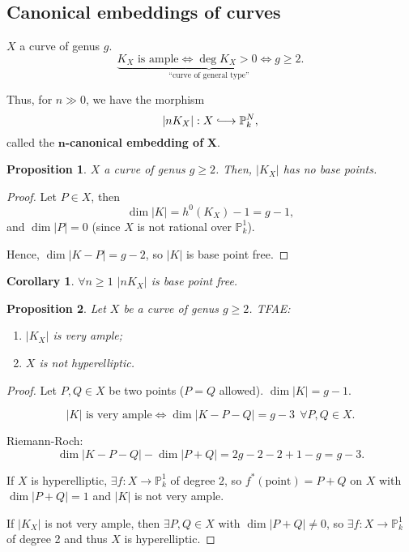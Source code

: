 \documentclass[12pt]{article}
\newtheorem*{proposition}{Proposition}
\newtheorem*{corollary}{Corollary}
\theoremstyle{definition}
\theoremstyle{remark}
\begin{document}
\subsection*{Canonical embeddings of curves}
$X$ a curve of genus $g$.
\[\underbrace{K_X\text{ is ample}\Longleftrightarrow\deg K_X>0\Longleftrightarrow g\geq2}_{\text{``curve of general type''}}.\]

Thus, for $n\gg0$, we have the morphism
\[|nK_X|:X\lhook\joinrel\longrightarrow\mathbb{P}_k^N,\]
called the $\boldsymbol{n}$\textbf{-canonical embedding of }$\boldsymbol{X}$.

\begin{proposition}
$X$ a curve of genus $g\geq2$. Then, $|K_X|$ has no base points.
\end{proposition}

\begin{proof}
Let $P\in X$, then
\[\dim|K|=h^0(K_X)-1=g-1,\]
and $\dim|P|=0$ (since $X$ is not rational over $\mathbb{P}_k^1$).

Hence, $\dim|K-P|=g-2$, so $|K|$ is base point free.
\end{proof}

\begin{corollary}
$\forall n\geq1$ $|nK_X|$ is base point free.
\end{corollary}

\begin{proposition}
Let $X$ be a curve of genus $g\geq2$. TFAE:
\begin{enumerate}[label=\arabic*)]
\item $|K_X|$ is very ample;
\item $X$ is not hyperelliptic.
\end{enumerate}
\end{proposition}

\begin{proof}
Let $P,Q\in X$ be two points ($P=Q$ allowed). $\dim|K|=g-1$.

\[|K|\text{ is very ample}\Longleftrightarrow\dim|K-P-Q|=g-3\ \ \forall P,Q\in X.\]

Riemann-Roch:
\[\dim|K-P-Q|-\dim|P+Q|=2g-2-2+1-g=g-3.\]

If $X$ is hyperelliptic, $\exists f:X\rightarrow\mathbb{P}_k^1$ of degree $2$, so $f^*(\text{point})=P+Q$ on $X$ with $\dim|P+Q|=1$ and $|K|$ is not very ample.

If $|K_X|$ is not very ample, then $\exists P,Q\in X$ with $\dim|P+Q|\neq0$, so $\exists f:X\rightarrow\mathbb{P}_k^1$ of degree 2 and thus $X$ is hyperelliptic.
\end{proof}
\end{document}
